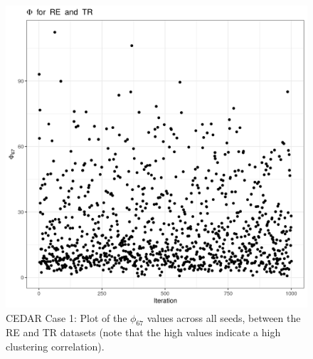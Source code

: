 \documentclass[14pt]{extarticle} %
\begin{document}
	\begin{figure}[h]
		\centering
		\includegraphics[scale=0.75]{Images/Biology_data/Set_250/All_datasets/Phi_series_plots/file_1_Phi_67.png}
		\caption{CEDAR Case 1: Plot of the $\phi_{67}$ values across all seeds, between the RE and TR datasets (note that the high values indicate a high clustering correlation).}
		\label{fig:results:cedar_1:mdi_re_tr_phi_series_plot}
	\end{figure}

	\newpage
	
	
	
%
\end{document}

